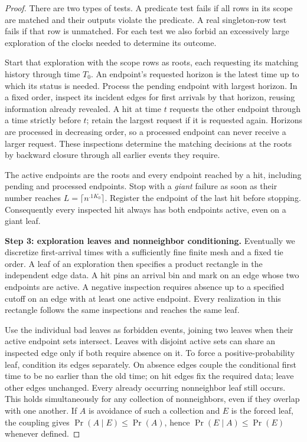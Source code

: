 \begin{proof}
There are two types of tests. A predicate test fails if all rows in its
scope are matched and their outputs violate the predicate. A real
singleton-row test fails if that row is unmatched. For each test we also
forbid an excessively large exploration of the clocks needed to determine
its outcome.

Start that exploration with the scope rows as roots, each requesting its
matching history through time \(T_0\). An endpoint's requested horizon
is the latest time up to which its status is needed. Process the pending
endpoint with largest horizon. In a fixed order, inspect its incident
edges for first arrivals by that horizon, reusing information already
revealed. A hit at time \(t\) requests the other endpoint through a time
strictly before \(t\); retain the largest request if it is requested
again. Horizons are processed in decreasing order, so a processed
endpoint can never receive a larger request. These inspections determine
the matching decisions at the roots by backward closure through all
earlier events they require.

The active endpoints are the roots and every endpoint reached by a hit,
including pending and processed endpoints. Stop with a \emph{giant}
failure as soon as their number reaches \(L=\lceil n^{.1K_0}\rceil\).
Register the endpoint of the last hit before stopping. Consequently every
inspected hit always has both endpoints active, even on a giant leaf.

\noindent\textbf{Step 3: exploration leaves and nonneighbor conditioning.}\quad
Eventually we discretize first-arrival times with a sufficiently fine
finite mesh and a fixed tie order. A leaf of an exploration then specifies
a product rectangle in the independent edge data. A hit pins an arrival
bin and mark on an edge whose two endpoints are active. A negative
inspection requires absence up to a specified cutoff on an edge with at
least one active endpoint. Every realization in this rectangle follows
the same inspections and reaches the same leaf.

Use the individual bad leaves as forbidden events, joining two leaves
when their active endpoint sets intersect. Leaves with disjoint active
sets can share an inspected edge only if both require absence on it.
To force a positive-probability leaf, condition its edges separately. On
absence edges couple the conditional first time to be no earlier than
the old time; on hit edges fix the required data; leave other edges
unchanged. Every already occurring nonneighbor leaf still occurs. This
holds simultaneously for any collection of nonneighbors, even if they
overlap with one another. If \(A\) is avoidance of such a collection
and \(E\) is the forced leaf, the coupling gives
\(\Pr(A\mid E)\le\Pr(A)\), hence
\(\Pr(E\mid A)\le\Pr(E)\) whenever defined.


\end{proof}
